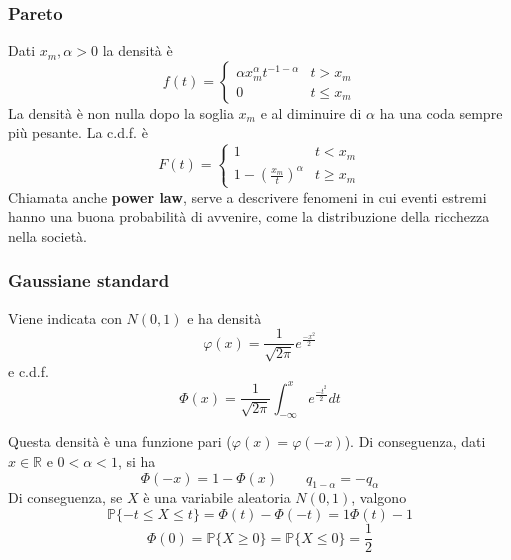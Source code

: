 \subsubsection{Pareto}
Dati $x_m, \alpha > 0$ la densità è
\begin{equation}
	f(t) = \begin{cases}
		\alpha x_m^\alpha t^{-1-\alpha} & t> x_m \\
		0 & t \leq x_m
	\end{cases}
\end{equation}
La densità è non nulla dopo la soglia $x_m$ e al diminuire di $\alpha$ ha una coda sempre più pesante. La c.d.f. è
\begin{equation}
	F(t) = \begin{cases}
		1 & t < x_m \\
		1-(\frac{x_m}{t})^\alpha & t \geq x_m
	\end{cases}
\end{equation}
Chiamata anche \textbf{power law}, serve a descrivere fenomeni in cui eventi estremi hanno una buona probabilità di avvenire, come la distribuzione della ricchezza nella società.

\subsubsection{Gaussiane standard}
Viene indicata con $N(0,1)$ e ha densità
\begin{equation}
	\varphi(x) = \frac{1}{\sqrt{2\pi}}e^{\frac{-x^2}{2}}
\end{equation}
e c.d.f.
\begin{equation}
	\Phi(x)=\frac{1}{\sqrt{2\pi}}\int_{-\infty}^{x}e^{\frac{-t^2}{2}}dt
\end{equation}

\begin{observation}
	Questa densità è una funzione pari ($\varphi(x) = \varphi(-x)$). Di conseguenza, dati $x \in \mathbb{R}$ e $0 < \alpha < 1$, si ha
	\begin{equation}
		\Phi(-x) = 1 - \Phi(x) \quad\quad q_{1-\alpha} = -q_\alpha
	\end{equation}
	Di conseguenza, se $X$ è una variabile aleatoria $N(0,1)$, valgono
	\begin{equation}
		\mathbb{P}\{-t \leq X \leq t\} = \Phi(t) - \Phi(-t) = 1\Phi(t) -1
	\end{equation}
	\begin{equation}
		\Phi(0) = \mathbb{P}\{X \geq 0\} = \mathbb{P}\{X \leq 0\} = \frac{1}{2}
	\end{equation}
\end{observation}

